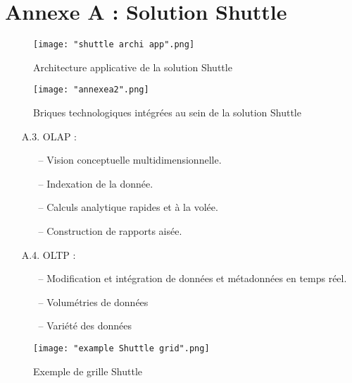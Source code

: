 \setcounter{figure}{0} 
\setcounter{table}{0}
\setcounter{footnote}{0}
\setcounter{equation}{0}
\pagestyle{fancy}
\fancyhf{}
\renewcommand{\chaptermark}[1]{\markboth{\MakeUppercase{#1 }}{}}
\renewcommand{\sectionmark}[1]{\markright{\thesection~ #1}}
\fancyhead[RO]{\bfseries\rightmark}
\fancyhead[LE]{\bfseries\leftmark}
\fancyfoot[RO]{\thepage}
\fancyfoot[LE]{\thepage}
\renewcommand{\headrulewidth}{0.5pt}
\renewcommand{\footrulewidth}{0pt}

\makeatletter
\renewcommand\thefigure{A.\arabic{figure}}
\renewcommand\thetable{A.\arabic{table}} 
\makeatother

\chapter{Annexe A : Solution Shuttle}
\graphicspath{{Annexe1/figures/}}


\begin{figure}[!ht]\centering
\texttt{[image: "shuttle archi app".png]}
\caption{Architecture applicative de la solution Shuttle}
\label{fig:fig1}
\end{figure}
\FloatBarrier
\begin{figure}[!ht]\centering
\texttt{[image: "annexea2".png]}
\caption{Briques technologiques intégrées au sein de la solution Shuttle}
\label{fig:fig1}
\end{figure}
\FloatBarrier
\vspace{-3mm}
\begin{itemize}
\item[A.3.] OLAP :
    \begin{itemize}
    \item[--] Vision conceptuelle multidimensionnelle.
    \item[--] Indexation de la donnée.
    \item[--] Calculs analytique rapides et à la volée.
    \item[--] Construction de rapports aisée.
    \end{itemize}
\item[A.4.] OLTP  :
    \begin{itemize}
    \item[--] Modification et intégration de données et métadonnées en temps réel.
    \item[--] Volumétries de données
    \item[--] Variété des données
    \end{itemize}
\end{itemize}
\begin{figure}[!ht]\centering
\texttt{[image: "example Shuttle grid".png]}
\caption{Exemple de grille Shuttle}
\label{fig:fig1}
\end{figure}
\FloatBarrier
